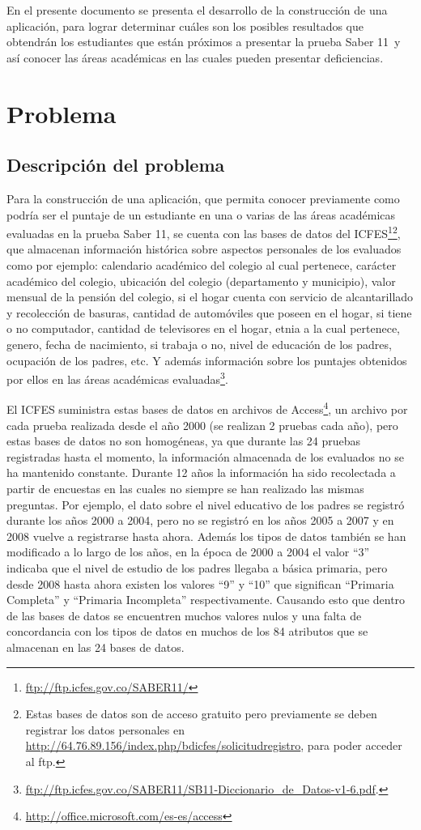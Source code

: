 En el presente documento se presenta el desarrollo de la construcción de una aplicación, para lograr determinar cuáles son los posibles resultados que obtendrán los estudiantes que están próximos a presentar la prueba Saber 11\degree \ y así conocer las áreas académicas en las cuales pueden presentar deficiencias.

\section{Problema}
\subsection{Descripción del problema}
Para la construcción de una aplicación, que permita conocer previamente como podría ser el puntaje de un estudiante en una o varias de las áreas académicas evaluadas en la prueba Saber 11\degree, se cuenta con las bases de datos del ICFES\footnote{\url{ftp://ftp.icfes.gov.co/SABER11/}}\footnote{Estas bases de datos son de acceso gratuito pero previamente se deben registrar los datos personales en \url{http://64.76.89.156/index.php/bdicfes/solicitudregistro}, para poder acceder al ftp.}, que almacenan información histórica sobre aspectos personales de los evaluados como por ejemplo: calendario académico del colegio al cual pertenece, carácter académico del colegio, ubicación del colegio (departamento y municipio), valor mensual de la pensión del colegio, si el hogar cuenta con servicio de alcantarillado y recolección de basuras, cantidad de automóviles que poseen en el hogar, si tiene o no computador, cantidad de televisores en el hogar, etnia a la cual pertenece, genero, fecha de nacimiento, si trabaja o no, nivel de educación de los padres, ocupación de los padres, etc. Y además información sobre los puntajes obtenidos por ellos en las áreas académicas evaluadas\footnote{\url{ftp://ftp.icfes.gov.co/SABER11/SB11-Diccionario_de_Datos-v1-6.pdf}.}.

El ICFES suministra estas bases de datos en archivos de Access\footnote{\url{http://office.microsoft.com/es-es/access}}, un archivo por cada prueba realizada desde el año 2000 (se realizan 2 pruebas cada año), pero estas bases de datos no son homogéneas, ya que durante las 24 pruebas registradas hasta el momento, la información almacenada de los evaluados no se ha mantenido constante. Durante 12 años la información ha sido recolectada a partir de encuestas en las cuales no siempre se han realizado las mismas preguntas. Por ejemplo, el dato sobre el nivel educativo de los padres se registró durante los años 2000 a 2004, pero no se registró en los años 2005 a 2007 y en 2008 vuelve a registrarse hasta ahora. Además los tipos de datos también se han modificado a lo largo de los años, en la época de 2000 a 2004 el valor ``3'' indicaba que el nivel de estudio de los padres llegaba a básica primaria, pero desde 2008 hasta ahora existen los valores ``9'' y ``10'' que significan ``Primaria Completa'' y ``Primaria Incompleta'' respectivamente. Causando esto que dentro de las bases de datos se encuentren muchos valores nulos y una falta de concordancia con los tipos de datos en muchos de los 84 atributos que se almacenan en las 24 bases de datos.

